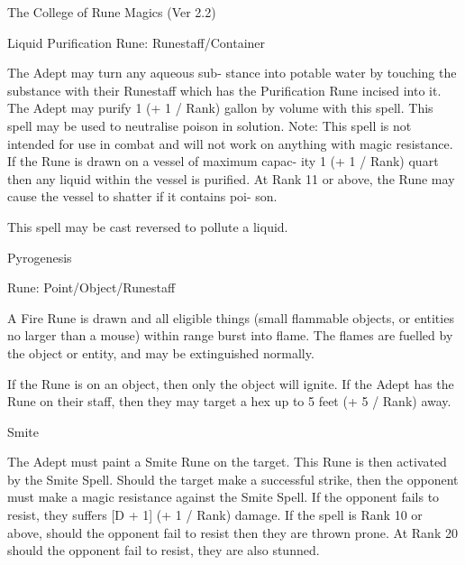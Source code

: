 \begin{Chapter}{The College of Rune Magics (Ver 2.2)}
\begin{spell}[G-5]{Liquid Purification }
Rune: Runestaff/Container 
\begin{effects}
 The  Adept  may  turn  any  aqueous  sub-
stance into potable water by touching the substance 
with  their  Runestaff  which  has  the  Purification 
Rune incised into it. The Adept may purify 1 (+ 1 / 
Rank) gallon by volume  with this spell.  This spell 
may be used to neutralise poison in solution. Note: 
This  spell  is  not  intended  for  use  in  combat  and 
will not work on anything with magic resistance. If 
the Rune is drawn on a vessel of maximum capac-
ity 1 (+ 1 / Rank) quart then any liquid within the 
vessel  is  purified.  At  Rank  11  or  above,  the  Rune 
may  cause  the  vessel  to  shatter  if  it  contains  poi-
son. 

This spell may be cast reversed to pollute a liquid. 

\end{effects}
\end{spell}

\begin{spell}[G-6]{Pyrogenesis }

Rune: Point/Object/Runestaff 
\begin{effects}
 A  Fire  Rune  is  drawn  and  all  eligible 
things  (small  flammable  objects,  or  entities  no 
larger than a mouse) within range burst into flame. 
The flames are fuelled by the object or entity, and 
may be extinguished normally. 

If  the  Rune  is  on  an  object,  then  only  the  object 
will ignite. If the Adept has the Rune on their staff, 
then they may target a hex up to 5 feet (+ 5 / Rank) 
away. 

\end{effects}
\end{spell}

\begin{spell}[G-7]{Smite}

\begin{effects}
The Adept must paint a Smite Rune on the target.  This Rune is then
activated by the Smite Spell.  Should the target make a successful
strike, then the opponent must make a magic resistance against the
Smite Spell.  If the opponent fails to resist, they suffers [D + 1] (+
1 / Rank) damage. If the spell is Rank 10 or above, should the
opponent fail to resist then they are thrown prone.  At Rank 20 should
the opponent fail to resist, they are also stunned.


\end{effects}
\end{spell}
\end{Chapter}
